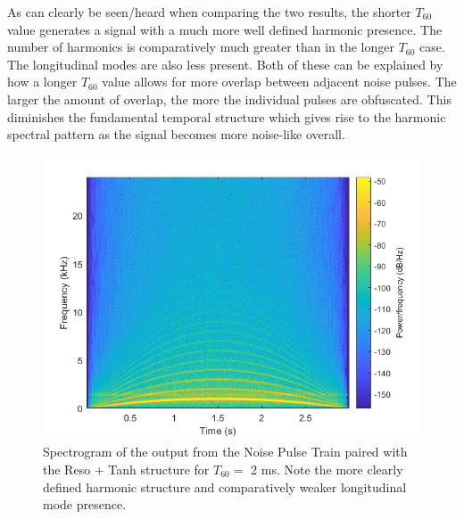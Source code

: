 \documentclass[../main.tex]{subfiles}
\begin{document}
As can clearly be seen/heard when comparing the two results, the shorter $T_{60}$ value generates a signal with a much more well defined harmonic presence. The number of harmonics is comparatively much greater than in the longer $T_{60}$ case. The longitudinal modes are also less present. Both of these can be explained by how a longer $T_{60}$ value allows for more overlap between adjacent noise pulses. The larger the amount of overlap, the more the individual pulses are obfuscated. This diminishes the fundamental temporal structure which gives rise to the harmonic spectral pattern as the signal becomes more noise-like overall.

\begin{figure}[!]
    \centering
    \includegraphics[scale=.60]{./images/plots/NPTResoTanhT60Short.png}
    \caption{Spectrogram of the output from the Noise Pulse Train paired with the Reso + Tanh structure for $T_{60} = $ 2 ms. Note the more clearly defined harmonic structure and comparatively weaker longitudinal mode presence.}
    \label{fig:NPT_RT_T60_Short}
\end{figure}
\end{document}
